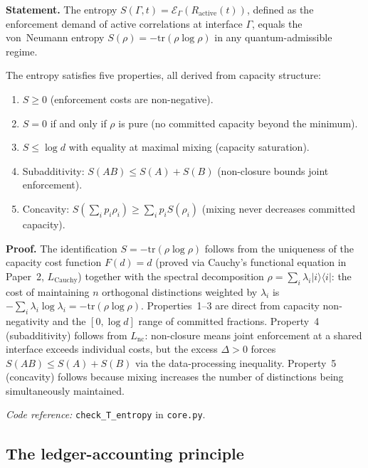 \documentclass[11pt]{article}
\newcommand{\coderef}[2]{\smallskip\noindent\textit{Code reference:} \texttt{#1} in \texttt{#2}.}
\newcommand{\epitag}[1]{\textbf{[#1]}}
\begin{document}
\begin{tcolorbox}[apfbox, title={Theorem $T_{\mathrm{entropy}}$ (Von~Neumann Entropy as Committed Capacity) \epitag{P}}]
\textbf{Statement.}
The entropy $S(\Gamma, t) = \mathcal{E}_\Gamma(R_{\mathrm{active}}(t))$,
defined as the enforcement demand of active correlations at interface
$\Gamma$, equals the von~Neumann entropy $S(\rho) = -\mathrm{tr}(\rho\log\rho)$
in any quantum-admissible regime.

The entropy satisfies five properties, all derived from capacity structure:
\begin{enumerate}[nosep]
\item $S \geq 0$ (enforcement costs are non-negative).
\item $S = 0$ if and only if $\rho$ is pure (no committed capacity beyond
  the minimum).
\item $S \leq \log d$ with equality at maximal mixing (capacity saturation).
\item Subadditivity: $S(AB) \leq S(A) + S(B)$ (non-closure bounds joint
  enforcement).
\item Concavity: $S(\sum_i p_i\rho_i) \geq \sum_i p_i S(\rho_i)$ (mixing
  never decreases committed capacity).
\end{enumerate}

\textbf{Proof.}  The identification $S = -\mathrm{tr}(\rho\log\rho)$ follows
from the uniqueness of the capacity cost function $F(d) = d$ (proved via
Cauchy's functional equation in Paper~2, $L_{\mathrm{Cauchy}}$) together
with the spectral decomposition $\rho = \sum_i \lambda_i |i\rangle\langle i|$:
the cost of maintaining $n$ orthogonal distinctions weighted by $\lambda_i$
is $-\sum_i \lambda_i \log\lambda_i = -\mathrm{tr}(\rho\log\rho)$.
Properties~1--3 are direct from capacity non-negativity and the
$[0, \log d]$ range of committed fractions.  Property~4 (subadditivity)
follows from $L_{\mathrm{nc}}$: non-closure means joint enforcement at a
shared interface exceeds individual costs, but the excess $\Delta > 0$
forces $S(AB) \leq S(A) + S(B)$ via the data-processing inequality.
Property~5 (concavity) follows because mixing increases the number of
distinctions being simultaneously maintained.

\coderef{check\_T\_entropy}{core.py}
\end{tcolorbox}

\subsection{The ledger-accounting principle}
\label{subsec:ledger_accounting}
\end{document}

